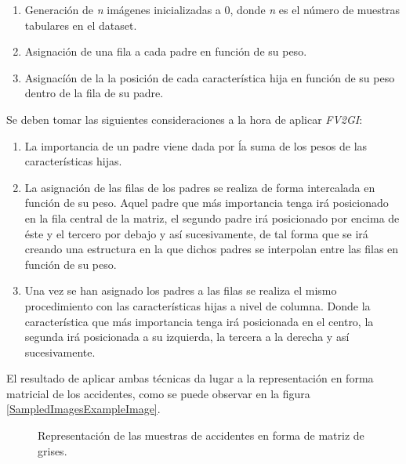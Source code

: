 \begin{enumerate}
\begin{enumerate}
                \item Generación de \textit{n} imágenes inicializadas a 0, donde \textit{n} es el número de muestras tabulares en el dataset.
                \item Asignación de una fila a cada padre en función de su peso.
                \item Asignacíón de la la posición de cada característica hija en función de su peso dentro de la fila de su padre.
            
            \end{enumerate}

            Se deben tomar las siguientes consideraciones a la hora de aplicar \textit{FV2GI}:

            \begin{enumerate}

                \item La importancia de un padre viene dada por ĺa suma de los pesos de las características hijas.

                \item La asignación de las filas de los padres se realiza de forma intercalada en función de su peso. Aquel padre que más importancia tenga irá posicionado en la fila central de la matriz, el segundo padre irá posicionado por encima de éste y el tercero por debajo y así sucesivamente, de tal forma que se irá creando una estructura en la que dichos padres se interpolan entre las filas en función de su peso.

                \item Una vez se han asignado los padres a las filas se realiza el mismo procedimiento con las características hijas a nivel de columna. Donde la característica que más importancia tenga irá posicionada en el centro, la segunda irá posicionada a su izquierda, la tercera a la derecha y así sucesivamente.


            \end{enumerate}

            El resultado de aplicar ambas técnicas da lugar a la representación en forma matricial de los accidentes, como se puede observar en la figura \ref{SampledImagesExampleImage}.

            \begin{figure}[H]
                \centering
                
                
                
                \caption{Representación de las muestras de accidentes en forma de matriz de grises.}


\end{figure}
\end{enumerate}
